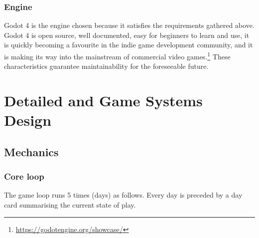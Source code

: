 \documentclass[a4paper,11pt]{article}
\begin{document}
\subsubsection{Engine}
Godot 4 is the engine chosen because it satisfies the requirements gathered above. Godot 4 is open source, well documented, easy for beginners to learn and use, it is quickly becoming a favourite in the indie game development community, and it is making its way into the mainstream of commercial video games.\footnote{\url{https://godotengine.org/showcase/}} These characteristics guarantee maintainability for the foreseeable future.

\section{Detailed and Game Systems Design}\label{detailed-and-game-systems-design}
\subsection{Mechanics}\label{mechanics}
\subsubsection{Core loop}\label{core-loop}
The game loop runs 5 times (days) as follows. Every day is preceded by a day card summarising the current state of play.
\end{document}

